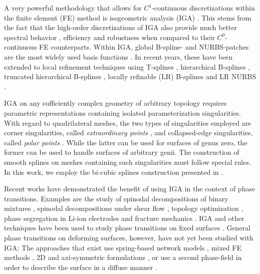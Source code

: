 \documentclass[11pt]{article}
\begin{document}
A very powerful methodology that allows for $C^1$-continuous discretizations within the finite element (FE) method is isogeometric analysis (IGA) \citep{hughes05}.
This stems from the fact that the high-order discretizations of IGA also provide much better spectral behavior  \citep{hughes05,cottrell2006isogeometric,cottrell2007studies}, efficiency \citep{akkerman2008role,morganti2015patient} and robustness \citep{lipton2010robustness} when compared to their $C^0$-continuous FE counterparts.
Within IGA, global B-spline- and NURBS-patches are the most widely used basis functions \citep{cottrell}. 
In recent years, these have been extended to local refinement techniques using T-splines \citep{scott12}, hierarchical B-splines \citep{hollig2003finite,schill12}, truncated hierarchical B-splines \citep{giannelli2012thb}, locally refinable (LR) B-splines \citep{dokken13,johannessen14} and LR NURBS \citep{zimmermann17}.

IGA on any sufficiently complex geometry of arbitrary topology requires parametric representations containing isolated parameterization singularities. With regard to quadrilateral meshes, the two types of singularities employed are corner singularities, called \emph{extraordinary points} \citep{scott2013isogeometric,toshniwal2017smooth}, and collapsed-edge singularities, called \emph{polar points} \citep{myles2011c2polar,toshniwal2017multi}. 
While the latter can be used for surfaces of genus zero, the former can be used to handle surfaces of arbitrary genii.
The construction of smooth splines on meshes containing such singularities must follow special rules.
In this work, we employ the bi-cubic splines construction presented in \citet{toshniwal2017smooth}.

Recent works have demonstrated the benefit of using IGA in the context of phase transitions. 
Examples are the study of spinodal decompositions of binary mixtures \citep{gomez08-1, bartezzaghi15, kastner16-1}, 
spinodal decompositions under shear flow \citep{liu13-1}, 
topology optimization \citep{dede12}, 
phase segregation in Li-ion electrodes \citep{stein2014,dileo14-1,zhao15-1,zhao2016,Xu2016} 
and fracture mechanics \citep{borden201277, borden14-1, borden16-1}.
IGA and other techniques have been used to study phase transitions on fixed surfaces \citep{mercker12,bartezzaghi15}. 
General phase transitions on deforming surfaces, however, have not yet been studied with IGA:
The approaches that exist use spring-based network models \citep{mcwhirter04}, mixed FE methods \citep{elliot10}, 2D and axi-symmetric formulations \citep{embar13}, or use a second phase-field in order to describe the surface in a diffuse manner \citep{wang08,lowengrub09}. 
\end{document}
